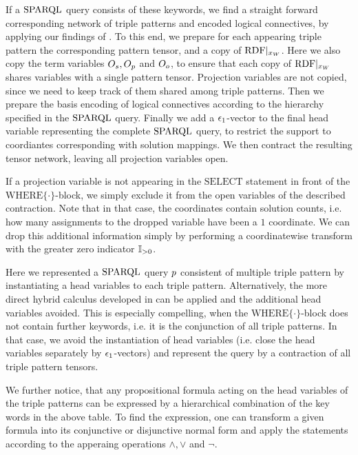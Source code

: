 If a $\mathrm{SPARQL}$ query consists of these keywords, we find a straight forward corresponding network of triple patterns and encoded logical connectives, by applying our findings of .
To this end, we prepare for each appearing triple pattern the corresponding pattern tensor, and a copy of ${\mathrm{RDF}}|_{x_{W}}$.
Here we also copy the term variables $O_{s},O_{p}$ and $O_{o}$, to ensure that each copy of ${\mathrm{RDF}}|_{x_{W}}$ shares variables with a single pattern tensor.
Projection variables are not copied, since we need to keep track of them shared among triple patterns.
Then we prepare the basis encoding of logical connectives according to the hierarchy specified in the $\mathrm{SPARQL}$ query.
Finally we add a $\epsilon_{1}$-vector to the final head variable representing the complete $\mathrm{SPARQL}$ query, to restrict the support to coordiantes corresponding with solution mappings.
We then contract the resulting tensor network, leaving all projection variables open.

If a projection variable is not appearing in the $\mathrm{SELECT}$ statement in front of the $\mathrm{WHERE}\{\cdot\}$-block, we simply exclude it from the open variables of the described contraction.
Note that in that case, the coordinates contain solution counts, i.e. how many assignments to the dropped variable have been a $1$ coordinate.
We can drop this additional information simply by performing a coordinatewise transform with the greater zero indicator $\mathbb{I}_{>0}$.

Here we represented a $\mathrm{SPARQL}$ query $p$ consistent of multiple triple pattern by instantiating a head variables to each triple pattern.
Alternatively, the more direct hybrid calculus developed in  can be applied and the additional head variables avoided.
This is especially compelling, when the $\mathrm{WHERE}\{\cdot\}$-block does not contain further keywords, i.e. it is the conjunction of all triple patterns.
In that case, we avoid the instantiation of head variables (i.e. close the head variables separately by $\epsilon_{1}$-vectors) and represent the query by a contraction of all triple pattern tensors.

We further notice, that any propositional formula acting on the head variables of the triple patterns can be expressed by a hierarchical combination of the key words in the above table.
To find the expression, one can transform a given formula into its conjunctive or disjunctive normal form and apply the statements according to the apperaing operations $\land,\lor$ and $\lnot$.


